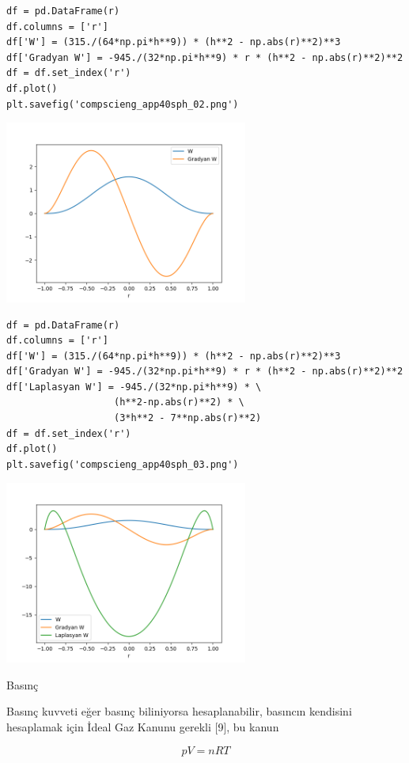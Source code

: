 \documentclass[12pt,fleqn]{article}\usepackage{../../common}
\begin{document}
\begin{verbatim}
df = pd.DataFrame(r)
df.columns = ['r']
df['W'] = (315./(64*np.pi*h**9)) * (h**2 - np.abs(r)**2)**3
df['Gradyan W'] = -945./(32*np.pi*h**9) * r * (h**2 - np.abs(r)**2)**2
df = df.set_index('r')
df.plot()
plt.savefig('compscieng_app40sph_02.png')
\end{verbatim}

\includegraphics[height=6cm]{compscieng_app40sph_02.png}

\begin{verbatim}
df = pd.DataFrame(r)
df.columns = ['r']
df['W'] = (315./(64*np.pi*h**9)) * (h**2 - np.abs(r)**2)**3
df['Gradyan W'] = -945./(32*np.pi*h**9) * r * (h**2 - np.abs(r)**2)**2
df['Laplasyan W'] = -945./(32*np.pi*h**9) * \
                   (h**2-np.abs(r)**2) * \
                   (3*h**2 - 7**np.abs(r)**2)
df = df.set_index('r')
df.plot()
plt.savefig('compscieng_app40sph_03.png')
\end{verbatim}

\includegraphics[height=6cm]{compscieng_app40sph_03.png}

Basınç

Basınç kuvveti eğer basınç biliniyorsa hesaplanabilir, basıncın kendisini
hesaplamak için İdeal Gaz Kanunu gerekli [9], bu kanun

$$
p V = n R T
$$
\end{document}
